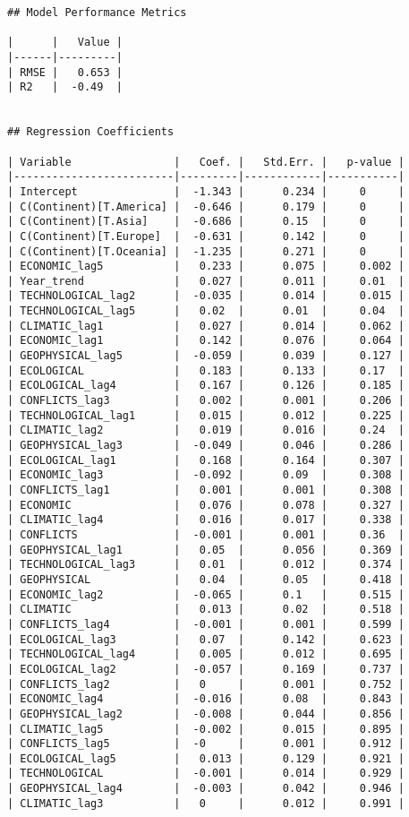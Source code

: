 \documentclass[
]{article}
\begin{document}
\label{results}
\begin{verbatim}
## Model Performance Metrics

|      |   Value |
|------|---------|
| RMSE |   0.653 |
| R2   |  -0.49  |


## Regression Coefficients

| Variable                |   Coef. |   Std.Err. |   p-value |
|-------------------------|---------|------------|-----------|
| Intercept               |  -1.343 |      0.234 |     0     |
| C(Continent)[T.America] |  -0.646 |      0.179 |     0     |
| C(Continent)[T.Asia]    |  -0.686 |      0.15  |     0     |
| C(Continent)[T.Europe]  |  -0.631 |      0.142 |     0     |
| C(Continent)[T.Oceania] |  -1.235 |      0.271 |     0     |
| ECONOMIC_lag5           |   0.233 |      0.075 |     0.002 |
| Year_trend              |   0.027 |      0.011 |     0.01  |
| TECHNOLOGICAL_lag2      |  -0.035 |      0.014 |     0.015 |
| TECHNOLOGICAL_lag5      |   0.02  |      0.01  |     0.04  |
| CLIMATIC_lag1           |   0.027 |      0.014 |     0.062 |
| ECONOMIC_lag1           |   0.142 |      0.076 |     0.064 |
| GEOPHYSICAL_lag5        |  -0.059 |      0.039 |     0.127 |
| ECOLOGICAL              |   0.183 |      0.133 |     0.17  |
| ECOLOGICAL_lag4         |   0.167 |      0.126 |     0.185 |
| CONFLICTS_lag3          |   0.002 |      0.001 |     0.206 |
| TECHNOLOGICAL_lag1      |   0.015 |      0.012 |     0.225 |
| CLIMATIC_lag2           |   0.019 |      0.016 |     0.24  |
| GEOPHYSICAL_lag3        |  -0.049 |      0.046 |     0.286 |
| ECOLOGICAL_lag1         |   0.168 |      0.164 |     0.307 |
| ECONOMIC_lag3           |  -0.092 |      0.09  |     0.308 |
| CONFLICTS_lag1          |   0.001 |      0.001 |     0.308 |
| ECONOMIC                |   0.076 |      0.078 |     0.327 |
| CLIMATIC_lag4           |   0.016 |      0.017 |     0.338 |
| CONFLICTS               |  -0.001 |      0.001 |     0.36  |
| GEOPHYSICAL_lag1        |   0.05  |      0.056 |     0.369 |
| TECHNOLOGICAL_lag3      |   0.01  |      0.012 |     0.374 |
| GEOPHYSICAL             |   0.04  |      0.05  |     0.418 |
| ECONOMIC_lag2           |  -0.065 |      0.1   |     0.515 |
| CLIMATIC                |   0.013 |      0.02  |     0.518 |
| CONFLICTS_lag4          |  -0.001 |      0.001 |     0.599 |
| ECOLOGICAL_lag3         |   0.07  |      0.142 |     0.623 |
| TECHNOLOGICAL_lag4      |   0.005 |      0.012 |     0.695 |
| ECOLOGICAL_lag2         |  -0.057 |      0.169 |     0.737 |
| CONFLICTS_lag2          |   0     |      0.001 |     0.752 |
| ECONOMIC_lag4           |  -0.016 |      0.08  |     0.843 |
| GEOPHYSICAL_lag2        |  -0.008 |      0.044 |     0.856 |
| CLIMATIC_lag5           |  -0.002 |      0.015 |     0.895 |
| CONFLICTS_lag5          |  -0     |      0.001 |     0.912 |
| ECOLOGICAL_lag5         |   0.013 |      0.129 |     0.921 |
| TECHNOLOGICAL           |  -0.001 |      0.014 |     0.929 |
| GEOPHYSICAL_lag4        |  -0.003 |      0.042 |     0.946 |
| CLIMATIC_lag3           |   0     |      0.012 |     0.991 |
\end{verbatim}
\end{document}
